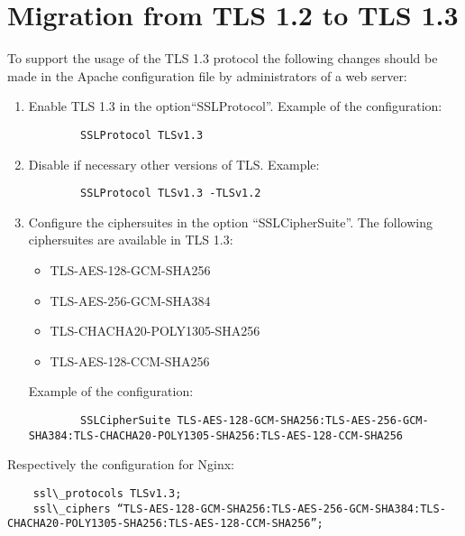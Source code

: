 \chapter{Migration from TLS 1.2 to TLS 1.3}
\label{chap:migration}

To support the usage of the TLS 1.3 protocol the following changes should be made in the Apache configuration file by administrators of a web server:\\
\begin{enumerate}
	\item Enable TLS 1.3 in the option“SSLProtocol”. Example of the configuration:
    \begin{verbatim}
        SSLProtocol TLSv1.3
    \end{verbatim}
    \item Disable if necessary other versions of TLS. Example: 
    \begin{verbatim}
        SSLProtocol TLSv1.3 -TLSv1.2
    \end{verbatim}
    \item Configure the ciphersuites in the option “SSLCipherSuite”. The following ciphersuites are available in TLS 1.3:
    \begin{itemize}
        \item TLS-AES-128-GCM-SHA256
        \item TLS-AES-256-GCM-SHA384
        \item TLS-CHACHA20-POLY1305-SHA256
        \item TLS-AES-128-CCM-SHA256
    \end{itemize}
    Example of the configuration:
    \begin{verbatim}
        SSLCipherSuite TLS-AES-128-GCM-SHA256:TLS-AES-256-GCM-SHA384:TLS-CHACHA20-POLY1305-SHA256:TLS-AES-128-CCM-SHA256
    \end{verbatim}
\end{enumerate}

Respectively the configuration for Nginx:
\begin{verbatim}
    ssl\_protocols TLSv1.3;
    ssl\_ciphers “TLS-AES-128-GCM-SHA256:TLS-AES-256-GCM-SHA384:TLS-CHACHA20-POLY1305-SHA256:TLS-AES-128-CCM-SHA256”;
\end{verbatim}
